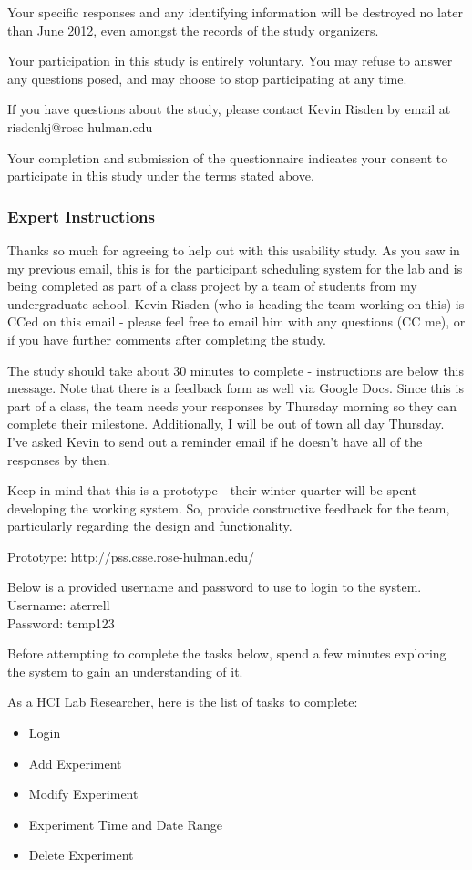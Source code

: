 Your specific responses and any identifying information will be destroyed no later than June 2012, even amongst the records of the study organizers.

Your participation in this study is entirely voluntary. You may refuse to answer any questions posed, and may choose to stop participating at any time.

If you have questions about the study, please contact Kevin Risden by email at risdenkj@rose-hulman.edu

Your completion and submission of the questionnaire indicates your consent to participate in this study under the terms stated above.

\subsubsection{Expert Instructions}
Thanks so much for agreeing to help out with this usability study. As you saw in my previous email, this is for the participant scheduling system for the lab and is being completed as part of a class project by a team of students from my undergraduate school. Kevin Risden (who is heading the team working on this) is CCed on this email - please feel free to email him with any questions (CC me), or if you have further comments after completing the study.

The study should take about 30 minutes to complete - instructions are below this message. Note that there is a feedback form as well via Google Docs. Since this is part of a class, the team needs your responses by Thursday morning so they can complete their milestone. Additionally, I will be out of town all day Thursday. I've asked Kevin to send out a reminder email if he doesn't have all of the responses by then.

Keep in mind that this is a prototype - their winter quarter will be spent developing the working system. So, provide constructive feedback for the team, particularly regarding the design and functionality.

Prototype: http://pss.csse.rose-hulman.edu/

Below is a provided username and password to use to login to the system.\\
Username: aterrell\\
Password: temp123

Before attempting to complete the tasks below, spend a few minutes exploring the system to gain an understanding of it.

As a HCI Lab Researcher, here is the list of tasks to complete:
\begin{itemize}
\item Login
\item Add Experiment
\item Modify Experiment
\item Experiment Time and Date Range
\item Delete Experiment
\end{itemize}

